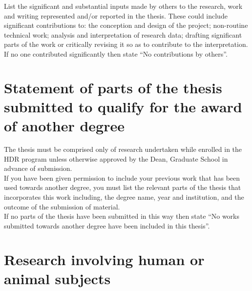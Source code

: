 \begin{instructional}
	List the significant and substantial inputs made by others to the research, work and writing represented and/or reported in the thesis. These could include significant contributions to: the conception and design of the project; non-routine technical work; analysis and interpretation of research data; drafting significant parts of the work or critically revising it so as to contribute to the interpretation. \\
    
    \noindent
	If no one contributed significantly then state ``No contributions by others''.
\end{instructional}





\section*{Statement of parts of the thesis submitted to qualify for the award of another degree}

\begin{instructional}
    The thesis must be comprised only of research undertaken while enrolled in the HDR program unless otherwise approved by the Dean, Graduate School in advance of submission.\\
    
    \noindent
    If you have been given permission to include your previous work that has been used towards another degree, you must list the relevant parts of the thesis that incorporates this work including, the degree name, year and institution, and the outcome of the submission of material. \\
    
    \noindent
    If no parts of the thesis have been submitted in this way then state ``No works submitted towards another degree have been included in this thesis''.
\end{instructional}





\section*{Research involving human or animal subjects}

